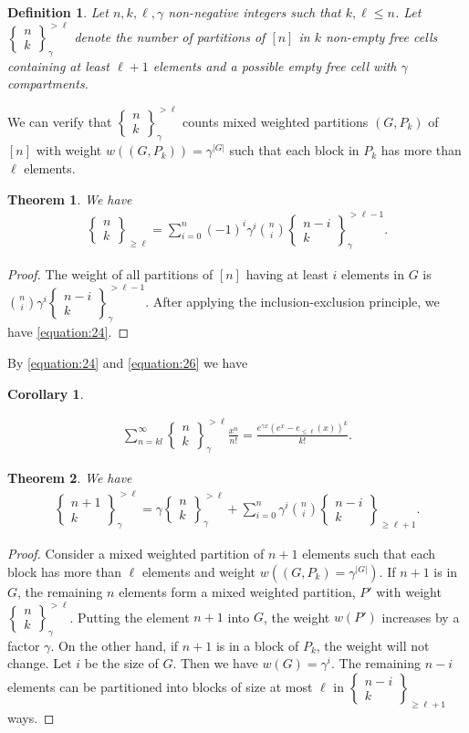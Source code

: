 \documentclass[12pt, reqno]{amsart}
\newtheorem{proof 1}{proof 1}
\newtheorem{theorem}{Theorem}[section]
\newtheorem{definition}{Definition}[section]
\newtheorem{corollary}{Corollary}[section]
\def\sts#1#2{\begin{Bmatrix}
#1 \\ #2 \end{Bmatrix}}
\begin{document}
\begin{definition}
Let $n,k,\ell,\gamma$ non-negative integers such that $k,\ell\leq n$. Let $\sts{n}{k}_{\gamma}^{>\ell}$ denote the number of partitions of $[n]$ in $k$ non-empty free cells containing at least $\ell+1$ elements and a possible empty free cell with $\gamma$ compartments.  
\end{definition}

We can verify that $\sts{n}{k}^{> \ell}_\gamma$ counts mixed weighted partitions $(G, P_k)$ of $[n]$ with weight $w((G,P_k)) = \gamma^{|G|}$ such that each block in $P_k$ has more than $\ell$ elements.



\begin{theorem}\label{theorem:3}We have
	\begin{align}\label{equation:24}
		\sts{n}{k}_{\geq \ell} = \sum_{i=0}^n(-1)^{i}\gamma^{i}\binom{n}{i}\sts{n-i}{k}^{>\ell-1}_\gamma.
	\end{align}
\end{theorem}
\begin{proof}The weight of all partitions of $[n]$  having at least $i$ elements in $G$ is $\binom{n}{i}\gamma^{i}\sts{n-i}{k}^{>\ell-1}_\gamma$. After applying the inclusion-exclusion principle, we have \ref{equation:24}.  
	
\end{proof}	
By \eqref{equation:24} and \eqref{equation:26} we have
\begin{corollary}\label{corollary:1}

	\begin{align*}\label{equation:4}
		\sum\limits_{n=kl}^\infty \sts{n}{k}^{>\ell}_\gamma\frac{x^n}{n!}=\frac{e^{\gamma x}\left(e^x-e_{\leq\ell}(x)\right)^k}{k!}.
	\end{align*}
\end{corollary}

\begin{theorem}
We have 
\begin{align*}
\sts{n+1}{k}_{\gamma}^{>\ell} = \gamma\sts{n}{k}_{\gamma}^{>\ell} + \sum_{i=0}^{n} \gamma^{i}\binom{n}{i}\sts{n-i}{k}_{\geq \ell+1}.
\end{align*}
\end{theorem}
\begin{proof}
Consider a mixed weighted partition of $n+1$ elements such that each block has more than $\ell$ elements and weight $w((G, P_k)=\gamma^{|G|})$. If $n+1$ is in $G$,  the remaining $n$ elements form a mixed weighted partition, $P'$ with weight $\sts{n}{k}_{\gamma}^{> \ell}$. Putting the element $n+1$ into $G$, the weight $w(P')$ increases by a factor $\gamma$.  On the other hand, if $n+1$ is in a block of $P_k$, the weight will not change. Let $i$ be the size of $G$. Then we have $w(G) = \gamma^i$.  The remaining $n-i$ elements can be partitioned into blocks of size at most $\ell$ in $\sts{n-i}{k}_{\geq \ell+1}$ ways. 
\end{proof}
\end{document}
